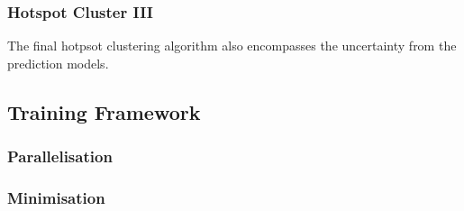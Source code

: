\subsubsection{Hotspot Cluster III}
The final hotpsot clustering algorithm also encompasses the uncertainty from the prediction models.

\subsection{Training Framework}
\blindtext[1]
\subsubsection{Parallelisation}
\blindtext[1]
\subsubsection{Minimisation}
\blindtext[1]
